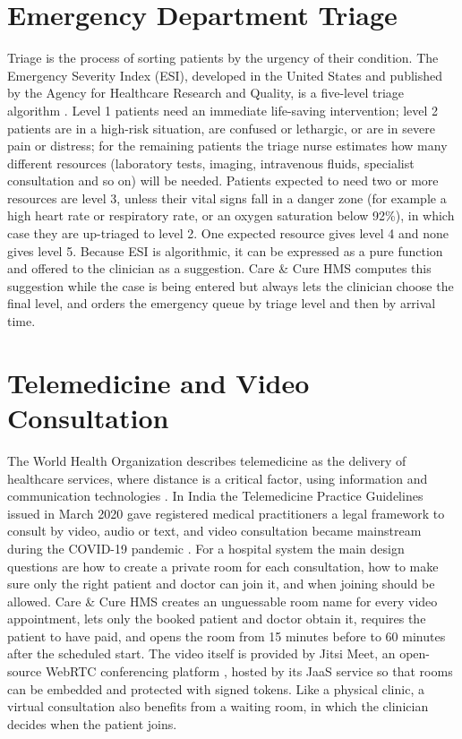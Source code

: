 \FloatBarrier
\section{Emergency Department Triage}

Triage is the process of sorting patients by the urgency of their condition. The Emergency Severity Index (ESI), developed in the United States and published by the Agency for Healthcare Research and Quality, is a five-level triage algorithm \cite{gilboy2012esi}. Level 1 patients need an immediate life-saving intervention; level 2 patients are in a high-risk situation, are confused or lethargic, or are in severe pain or distress; for the remaining patients the triage nurse estimates how many different resources (laboratory tests, imaging, intravenous fluids, specialist consultation and so on) will be needed. Patients expected to need two or more resources are level 3, unless their vital signs fall in a danger zone (for example a high heart rate or respiratory rate, or an oxygen saturation below 92\%), in which case they are up-triaged to level 2. One expected resource gives level 4 and none gives level 5. Because ESI is algorithmic, it can be expressed as a pure function and offered to the clinician as a suggestion. Care \& Cure HMS computes this suggestion while the case is being entered but always lets the clinician choose the final level, and orders the emergency queue by triage level and then by arrival time.

\FloatBarrier
\section{Telemedicine and Video Consultation}

The World Health Organization describes telemedicine as the delivery of healthcare services, where distance is a critical factor, using information and communication technologies \cite{who2010telemedicine}. In India the Telemedicine Practice Guidelines issued in March 2020 gave registered medical practitioners a legal framework to consult by video, audio or text, and video consultation became mainstream during the COVID-19 pandemic \cite{mohfw2020telemedicine}. For a hospital system the main design questions are how to create a private room for each consultation, how to make sure only the right patient and doctor can join it, and when joining should be allowed. Care \& Cure HMS creates an unguessable room name for every video appointment, lets only the booked patient and doctor obtain it, requires the patient to have paid, and opens the room from 15 minutes before to 60 minutes after the scheduled start. The video itself is provided by Jitsi Meet, an open-source WebRTC conferencing platform \cite{jitsi}, hosted by its JaaS service so that rooms can be embedded and protected with signed tokens. Like a physical clinic, a virtual consultation also benefits from a waiting room, in which the clinician decides when the patient joins.

